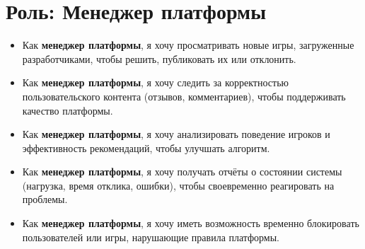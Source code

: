 \documentclass[a4paper,12pt]{article}
\begin{document}
\section{Роль: Менеджер платформы}

\begin{itemize}[leftmargin=2cm]
    \item Как \textbf{менеджер платформы}, я хочу просматривать новые игры, загруженные разработчиками, чтобы решить, публиковать их или отклонить.
    \item Как \textbf{менеджер платформы}, я хочу следить за корректностью пользовательского контента (отзывов, комментариев), чтобы поддерживать качество платформы.
    \item Как \textbf{менеджер платформы}, я хочу анализировать поведение игроков и эффективность рекомендаций, чтобы улучшать алгоритм.
    \item Как \textbf{менеджер платформы}, я хочу получать отчёты о состоянии системы (нагрузка, время отклика, ошибки), чтобы своевременно реагировать на проблемы.
    \item Как \textbf{менеджер платформы}, я хочу иметь возможность временно блокировать пользователей или игры, нарушающие правила платформы.
\end{itemize}
\end{document}
